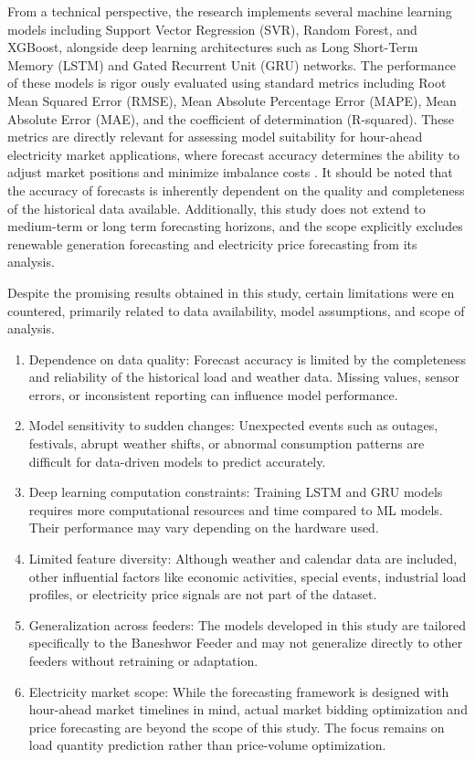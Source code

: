 \documentclass[oneside, 12pt]{book}
\numberwithin{equation}{chapter}
\begin{document}
From a technical perspective, the research implements several machine learning
models including Support Vector Regression (SVR), Random Forest, and XGBoost,
alongside deep learning architectures such as Long Short-Term Memory (LSTM) and
Gated Recurrent Unit (GRU) networks. The performance of these models is rigor
ously evaluated using standard metrics including Root Mean Squared Error (RMSE),
Mean Absolute Percentage Error (MAPE), Mean Absolute Error (MAE), and the
coefficient of determination (R-squared). These metrics are directly relevant for assessing model suitability for hour-ahead electricity market applications, where forecast accuracy determines the ability to adjust market positions and minimize imbalance costs \parencite{conejo2010decision}. It should be noted that the accuracy of
forecasts is inherently dependent on the quality and completeness of the historical
data available. Additionally, this study does not extend to medium-term or long
term forecasting horizons, and the scope explicitly excludes renewable generation
forecasting and electricity price forecasting from its analysis.

Despite the promising results obtained in this study, certain limitations were en
countered, primarily related to data availability, model assumptions, and scope of
analysis.

\begin{enumerate}
	\item Dependence on data quality: Forecast accuracy is limited by the completeness and reliability of the historical load and weather data. Missing values, sensor errors, or inconsistent reporting can influence model performance.
	\item Model sensitivity to sudden changes: Unexpected events such as outages, festivals, abrupt weather shifts, or abnormal consumption patterns are difficult for data-driven models to predict accurately.
	\item Deep learning computation constraints: Training LSTM and GRU models requires more computational resources and time compared to ML models. Their performance may vary depending on the hardware used.
	\item Limited feature diversity: Although weather and calendar data are included, other influential factors like economic activities, special events, industrial load profiles, or electricity price signals are not part of the dataset.
	\item Generalization across feeders: The models developed in this study are tailored specifically to the Baneshwor Feeder and may not generalize directly to other feeders without retraining or adaptation.
	\item Electricity market scope: While the forecasting framework is designed with hour-ahead market timelines in mind, actual market bidding optimization and price forecasting are beyond the scope of this study. The focus remains on load quantity prediction rather than price-volume optimization.
\end{enumerate}
\end{document}
